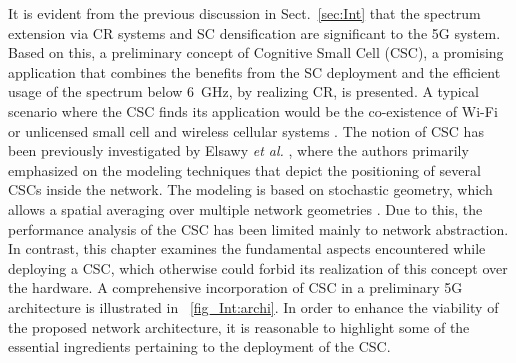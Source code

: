 It is evident from the previous discussion in Sect.~\ref{sec:Int} that the spectrum extension via CR systems and SC densification are significant to the 5G system. %
Based on this, a preliminary concept of Cognitive Small Cell (CSC), a promising application that combines the benefits from the SC deployment and the efficient usage of the spectrum below \SI{6}{GHz}, by realizing CR, is presented. A typical scenario where the CSC finds its application would be the co-existence of Wi-Fi or unlicensed small cell and wireless cellular systems \cite{Benn13}. The notion of CSC has been previously investigated by Elsawy \textit{et al.} \cite{Elsawy13_cmag}, where the authors primarily emphasized on the modeling techniques that depict the positioning of several CSCs inside the network. The modeling is based on stochastic geometry, which allows a spatial averaging over multiple network geometries \cite{Haenggi}. Due to this, the performance analysis of the CSC has been limited mainly to network abstraction. In contrast, this chapter examines the fundamental aspects encountered while deploying a CSC, which otherwise could forbid its realization of this concept over the hardware. %
 A comprehensive incorporation of CSC in a preliminary 5G architecture is illustrated in \figurename~\ref{fig_Int:archi}. In order to enhance the viability of the proposed network architecture, it is reasonable to highlight some of the essential ingredients pertaining to the deployment of the CSC.


